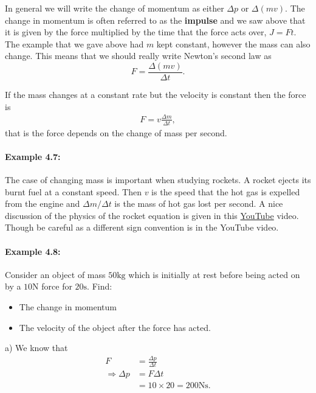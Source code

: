 In general we will write the change of momentum as either $\Delta p$ or $\Delta \left(mv\right)$. The change in momentum is often referred to as the \textbf{impulse} and we saw above that it is given by the force multiplied by the time that the force acts over, $J=F t$. The example that we gave above had $m$ kept constant, however the mass can also change. This means that we should really write Newton's second law as
\begin{equation*}
F=\frac{\Delta\left(mv\right)}{\Delta t}.
\end{equation*}

If the mass changes at a constant rate but the velocity is constant then the force is 
\begin{align*}
F=v\frac{\Delta m}{\Delta t},
\end{align*}
that is the force depends on the change of mass per second.

\paragraph{Example 4.7:} The case of changing mass is important when studying rockets. A rocket ejects its burnt fuel at a constant speed. Then $v$ is the speed that the hot gas is expelled from the engine and $\Delta m/\Delta t$ is the mass of hot gas lost per second.  A nice discussion of the physics of the rocket equation is given in this \href{https://www.youtube.com/watch?v=V_brZ-KWY3g}{YouTube} video. Though be careful as a different sign convention is in the YouTube video.

\paragraph{Example 4.8:} Consider an object of mass $50 \text{kg}$ which is initially at rest before being acted on by a $10\text{N}$ force for $20\text{s}$. Find:
\begin{itemize}
\setlength{\itemsep}{-5pt}
    \item[a)] The change in momentum
    \item[b)] The velocity of the object after the force has acted.
\end{itemize} 

a) We know that 
\begin{align*}
F&=\frac{\Delta p}{\Delta t}\\
\Rightarrow \Delta p&=F\Delta t\\
&=10\times 20 =200 \text{Ns}.
\end{align*}

